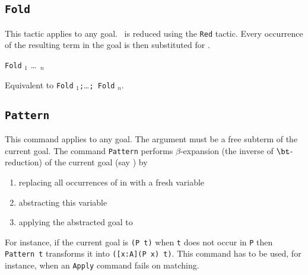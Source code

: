 \subsection{{\tt Fold} \term}

This tactic applies to any goal. \term\ is reduced using the {\tt Red}
tactic. Every occurrence of the resulting term in the goal is then
substituted for \term.

\begin{Variants}
\item {\tt Fold} \term$_1$ \dots\ \term$_n$ 
  
  Equivalent to {\tt Fold} \term$_1${\tt;}\ldots{\tt; Fold} \term$_n$.
\end{Variants}

\subsection{{\tt Pattern {\term}}}
\label{Pattern}

This command applies to any goal. The argument {\term} must be a free
subterm of the current goal.  The command {\tt Pattern} performs
$\beta$-expansion (the inverse of $\bt$-reduction) of the current goal
(say \T) by
\begin{enumerate}
\item replacing all occurrences of {\term} in {\T} with a fresh variable
\item abstracting this variable
\item applying the abstracted goal to {\term}
\end{enumerate}
For instance, if the current goal {\T} is {\tt (P t)} when {\tt t} does not occur in
{\tt P} then {\tt Pattern t} transforms it into {\tt ([x:A](P x) t)}. This
command has to be used, for instance, when an {\tt Apply} command
fails on matching.


